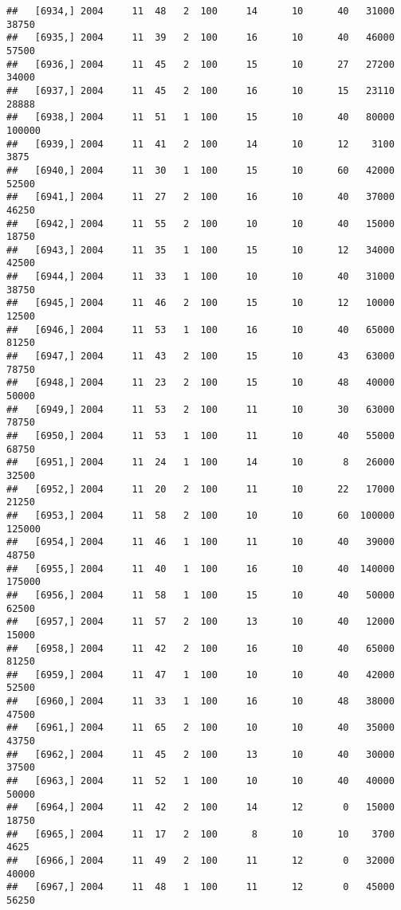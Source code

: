 \documentclass{article}\usepackage[]{graphicx}\usepackage[]{color}
\makeatletter
\newenvironment{kframe}{%
 \def\at@end@of@kframe{}%
 \ifinner\ifhmode%
  \def\at@end@of@kframe{\end{minipage}}%
  \begin{minipage}{\columnwidth}%
 \fi\fi%
 \def\FrameCommand##1{\hskip\@totalleftmargin \hskip-\fboxsep
 \colorbox{shadecolor}{##1}\hskip-\fboxsep
     \hskip-\linewidth \hskip-\@totalleftmargin \hskip\columnwidth}%
 \MakeFramed {\advance\hsize-\width
   \@totalleftmargin\z@ \linewidth\hsize
   \@setminipage}}%
 {\par\unskip\endMakeFramed%
 \at@end@of@kframe}
\newenvironment{knitrout}{}{} %
\makeatother
\begin{document}
\begin{knitrout}
\begin{kframe}
\begin{verbatim}
##   [6934,] 2004     11  48   2  100     14      10      40   31000   38750
##   [6935,] 2004     11  39   2  100     16      10      40   46000   57500
##   [6936,] 2004     11  45   2  100     15      10      27   27200   34000
##   [6937,] 2004     11  45   2  100     16      10      15   23110   28888
##   [6938,] 2004     11  51   1  100     15      10      40   80000  100000
##   [6939,] 2004     11  41   2  100     14      10      12    3100    3875
##   [6940,] 2004     11  30   1  100     15      10      60   42000   52500
##   [6941,] 2004     11  27   2  100     16      10      40   37000   46250
##   [6942,] 2004     11  55   2  100     10      10      40   15000   18750
##   [6943,] 2004     11  35   1  100     15      10      12   34000   42500
##   [6944,] 2004     11  33   1  100     10      10      40   31000   38750
##   [6945,] 2004     11  46   2  100     15      10      12   10000   12500
##   [6946,] 2004     11  53   1  100     16      10      40   65000   81250
##   [6947,] 2004     11  43   2  100     15      10      43   63000   78750
##   [6948,] 2004     11  23   2  100     15      10      48   40000   50000
##   [6949,] 2004     11  53   2  100     11      10      30   63000   78750
##   [6950,] 2004     11  53   1  100     11      10      40   55000   68750
##   [6951,] 2004     11  24   1  100     14      10       8   26000   32500
##   [6952,] 2004     11  20   2  100     11      10      22   17000   21250
##   [6953,] 2004     11  58   2  100     10      10      60  100000  125000
##   [6954,] 2004     11  46   1  100     11      10      40   39000   48750
##   [6955,] 2004     11  40   1  100     16      10      40  140000  175000
##   [6956,] 2004     11  58   1  100     15      10      40   50000   62500
##   [6957,] 2004     11  57   2  100     13      10      40   12000   15000
##   [6958,] 2004     11  42   2  100     16      10      40   65000   81250
##   [6959,] 2004     11  47   1  100     10      10      40   42000   52500
##   [6960,] 2004     11  33   1  100     16      10      48   38000   47500
##   [6961,] 2004     11  65   2  100     10      10      40   35000   43750
##   [6962,] 2004     11  45   2  100     13      10      40   30000   37500
##   [6963,] 2004     11  52   1  100     10      10      40   40000   50000
##   [6964,] 2004     11  42   2  100     14      12       0   15000   18750
##   [6965,] 2004     11  17   2  100      8      10      10    3700    4625
##   [6966,] 2004     11  49   2  100     11      12       0   32000   40000
##   [6967,] 2004     11  48   1  100     11      12       0   45000   56250

\end{verbatim}
\end{kframe}
\end{knitrout}
\end{document}
